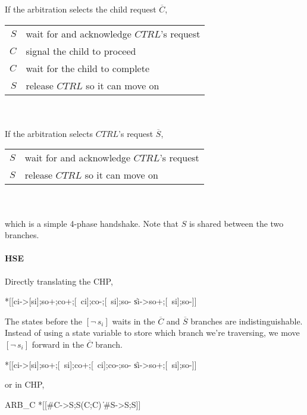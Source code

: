 \documentclass{article}
\begin{document}
\noindent If the arbitration selects the child request $\overline{C}$, 

\begin{tabular}[]{rl}
  $S$ & wait for and acknowledge $CTRL$'s request \\
  $C$ & signal the child to proceed \\
  $C$ & wait for the child to complete \\
  $S$ & release $CTRL$ so it can move on \\
\end{tabular} \\ \\

\noindent If the arbitration selects $CTRL$'s request $\overline{S}$,

\begin{tabular}[]{rl}
  $S$ & wait for and acknowledge $CTRL$'s request \\
  $S$ & release $CTRL$ so it can move on \\
\end{tabular} \\ \\

\noindent which is a simple 4-phase handshake. Note that $S$ is shared between the two branches.

\paragraph{HSE}

Directly translating the CHP,

\begin{hse}
*[[ci->[si];so+;co+;[~ci];co-;[~si];so-
  \|si->so+;[~si];so-]]
\end{hse}

The states before the $[\neg\,s_i]$ waits in the $\overline{C}$ and $\overline{S}$ branches are indistinguishable. Instead of using a state variable to store which branch we're traversing, we move $[\neg\,s_i]$ forward in the $\overline{C}$ branch. 

\begin{hse}
*[[ci->[si];so+;[~si];co+;[~ci];co-;so-
  \|si->so+;[~si];so-]]
\end{hse}

\noindent or in CHP,

\begin{csp}
ARB_C\equiv
*[[#C->S;S\star(C;C)
  \|#S->S;S]]
\end{csp}
\end{document}

